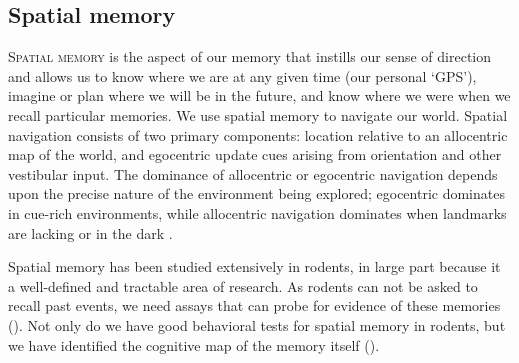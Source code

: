 \subsection{Spatial memory}\label{sec:intro:memory:spatial}
\textsc{Spatial memory} is the aspect of our memory that instills our sense of direction and allows us to know where we are at any given time (our personal `GPS'), imagine or plan where we will be in the future, and know where we were when we recall particular memories.
We use spatial memory to navigate our world.
Spatial navigation consists of two primary components: location relative to an allocentric map of the world, and egocentric update cues arising from orientation and other vestibular input.
The dominance of allocentric or egocentric navigation depends upon the precise nature of the environment being explored; egocentric dominates in cue-rich environments, while allocentric navigation dominates when landmarks are lacking or in the dark \citep{Knierim1998, Markus1994}.

Spatial memory has been studied extensively in rodents, in large part because it a well-defined and tractable area of research.
As rodents can not be asked to recall past events, we need assays that can probe for evidence of these memories ().
Not only do we have good behavioral tests for spatial memory in rodents, but we have identified the cognitive map of the memory itself ().

